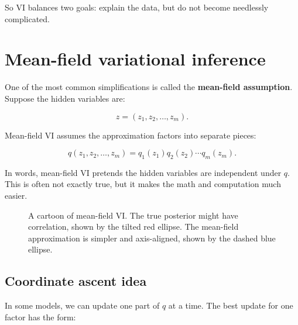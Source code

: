 \documentclass[11pt]{article}
\begin{document}
So VI balances two goals: explain the data, but do not become needlessly complicated.

\section{Mean-field variational inference}

One of the most common simplifications is called the \textbf{mean-field assumption}.
Suppose the hidden variables are:

\[
z = (z_1,z_2,\ldots,z_m).
\]

Mean-field VI assumes the approximation factors into separate pieces:

\begin{equation}
\boxed{
q(z_1,z_2,\ldots,z_m) = q_1(z_1)q_2(z_2)\cdots q_m(z_m).
}
\end{equation}

In words, mean-field VI pretends the hidden variables are independent under $q$.
This is often not exactly true, but it makes the math and computation much easier.

\begin{figure}[h]
\centering
{}
\caption{A cartoon of mean-field VI. The true posterior might have correlation, shown by the tilted red ellipse. The mean-field approximation is simpler and axis-aligned, shown by the dashed blue ellipse.}
\end{figure}

\subsection{Coordinate ascent idea}

In some models, we can update one part of $q$ at a time.
The best update for one factor has the form:
\end{document}
